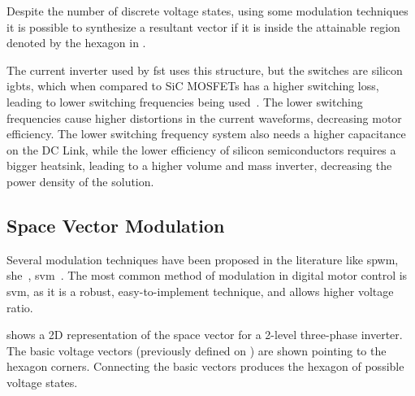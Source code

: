 Despite the number of discrete voltage states, using some modulation techniques it is possible to synthesize a resultant vector if it is inside the attainable region denoted by the hexagon in .

The current inverter used by \gls{fst} uses this structure, but the switches are silicon \gls{igbt}s, which when compared to SiC MOSFETs has a higher switching loss, leading to lower switching frequencies being used~\cite{Gurpinar:si_sic_gan_comparison:2016:IEEE}. The lower switching frequencies cause higher distortions in the current waveforms, decreasing motor efficiency. The lower switching frequency system also needs a higher capacitance on the DC Link, while the lower efficiency of silicon semiconductors requires a bigger heatsink, leading to a higher volume and mass inverter, decreasing the power density of the solution.

\subsection{Space Vector Modulation}
\label{subsection:Space Vector Modulation}%

Several modulation techniques have been proposed in the literature like \gls{spwm}, \gls{she}~\cite{Asadzadeh:selective_harmonic_elimination:2019}, \gls{svm}~\cite{Neacsu:SVM_intro:2001:IECON}.
The most common method of modulation in digital motor control is \gls{svm}, as it is a robust, easy-to-implement technique, and allows higher voltage ratio. 

 shows a 2D representation of the space vector for a 2-level three-phase inverter. The basic voltage vectors (previously defined on ) are shown pointing to the hexagon corners. 
 Connecting the basic vectors produces the hexagon of possible voltage states.

